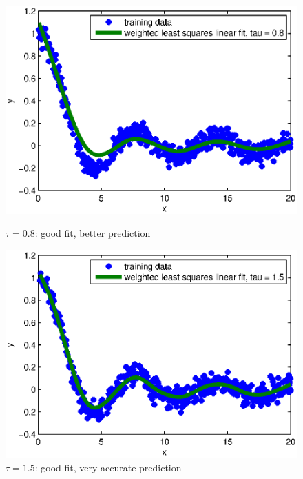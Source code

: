 \documentclass{article}
\begin{document}
	\begin{figure}
		\centering
		\begin{minipage}{.5\textwidth}
			\centering
			\includegraphics[width=.9\linewidth]{LWR-0-8.eps}
			\caption{$\tau = 0.8$: good fit, better prediction}
			\label{fig:sub1}
		\end{minipage}%
		\begin{minipage}{.5\textwidth}
			\centering
			\includegraphics[width=.9\linewidth]{LWR-1-5.eps}
			\caption{$\tau = 1.5$: good fit, very accurate prediction}
			\label{fig:sub1}
		\end{minipage}
	\end{figure}	
\end{document}
